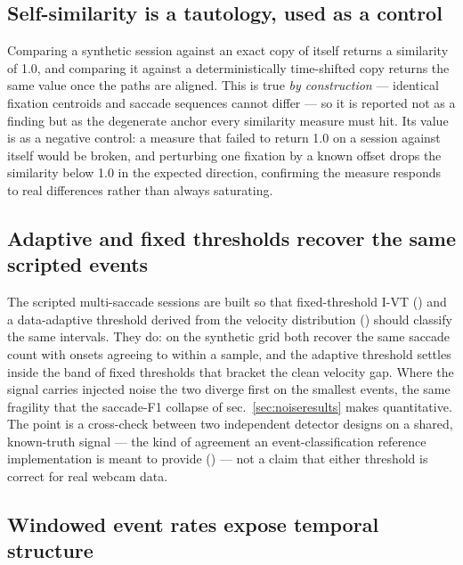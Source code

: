 \documentclass[
]{article}
\begin{document}
\subsection{Self-similarity is a tautology, used as a
control}\label{self-similarity-is-a-tautology-used-as-a-control}

Comparing a synthetic session against an exact copy of itself returns a
similarity of 1.0, and comparing it against a deterministically
time-shifted copy returns the same value once the paths are aligned.
This is true \emph{by construction} --- identical fixation centroids and
saccade sequences cannot differ --- so it is reported not as a finding
but as the degenerate anchor every similarity measure must hit. Its
value is as a negative control: a measure that failed to return 1.0 on a
session against itself would be broken, and perturbing one fixation by a
known offset drops the similarity below 1.0 in the expected direction,
confirming the measure responds to real differences rather than always
saturating.

\subsection{Adaptive and fixed thresholds recover the same scripted
events}\label{adaptive-and-fixed-thresholds-recover-the-same-scripted-events}

The scripted multi-saccade sessions are built so that fixed-threshold
I-VT () and a data-adaptive threshold derived from the velocity
distribution () should classify the same intervals. They do: on the synthetic
grid both recover the same saccade count with onsets agreeing to within
a sample, and the adaptive threshold settles inside the band of fixed
thresholds that bracket the clean velocity gap. Where the signal carries
injected noise the two diverge first on the smallest events, the same
fragility that the saccade-F1 collapse of sec.~\ref{sec:noiseresults}
makes quantitative. The point is a cross-check between two independent
detector designs on a shared, known-truth signal --- the kind of
agreement an event-classification reference implementation is meant to
provide () --- not a
claim that either threshold is correct for real webcam data.

\subsection{Windowed event rates expose temporal
structure}\label{windowed-event-rates-expose-temporal-structure}
\end{document}
